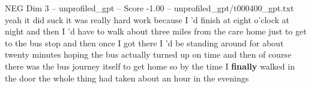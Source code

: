 \begin{textsample}{NEG Dim 3 – unprofiled\_gpt – Score -1.00 – unprofiled\_gpt/t000400\_gpt.txt}  \label{ex:f3_neg_008}
yeah it did suck it was really hard work because I ’d finish at eight o’clock at night and then I ’d have to walk about three miles from the care home just to get to the bus stop and then once I got there I ’d be standing around for about twenty minutes hoping the bus actually turned up on time and then of course there was the bus journey itself to get home so by the time I \textbf{finally} walked in the door the whole thing had taken about an hour in the evenings

\end{textsample}
